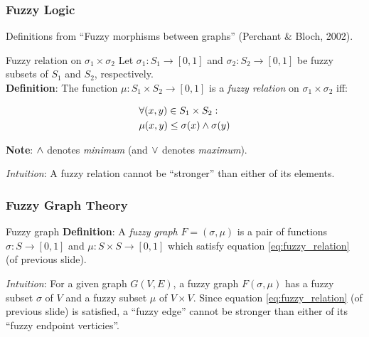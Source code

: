 \begin{frame}
	\frametitle{Fuzzy Logic}

	Definitions from ``Fuzzy morphisms between graphs'' {\footnotesize (Perchant \& Bloch, 2002)}.

	\begin{block}{Fuzzy relation on $\sigma_1 \times \sigma_2$}
		Let $\sigma_1: S_1 \rightarrow [0, 1]$ and $\sigma_2: S_2 \rightarrow [0, 1]$ be fuzzy subsets of $S_1$ and $S_2$, respectively. \\
		\textbf{Definition}: The function $\mu: S_1 \times S_2 \rightarrow [0, 1]$ is a \textit{fuzzy relation} on $\sigma_1 \times \sigma_2$ iff:

		\begin{equation}
			\begin{aligned}
				& \forall (x, y) \in S_1 \times S_2: \\
				& \mu(x, y) \le \sigma(x) \land \sigma(y)
			\end{aligned}
			\label{eq:fuzzy_relation}
		\end{equation}

		{\small \textbf{Note}: $\land$ denotes \textit{minimum} (and $\lor$ denotes \textit{maximum}).}

		\vspace*{2em}

		\textit{Intuition}: A fuzzy relation cannot be ``stronger'' than either of its elements.
	\end{block}
\end{frame}

\begin{frame}
	\frametitle{Fuzzy Graph Theory}

	\begin{block}{Fuzzy graph}
		\textbf{Definition}: A \textit{fuzzy graph} $F = (\sigma, \mu)$ is a pair of functions $\sigma: S \rightarrow [0, 1]$ and $\mu: S \times S \rightarrow [0, 1]$ which satisfy equation \ref{eq:fuzzy_relation} (of previous slide).

		\vspace*{2em}

		\textit{Intuition}: For a given graph $G(V, E)$, a fuzzy graph $F(\sigma, \mu)$ has a fuzzy subset $\sigma$ of $V$ and a fuzzy subset $\mu$ of $V \times V$. Since equation \ref{eq:fuzzy_relation} (of previous slide) is satisfied, a ``fuzzy edge'' cannot be stronger than either of its ``fuzzy endpoint verticies''.
	\end{block}
\end{frame}

